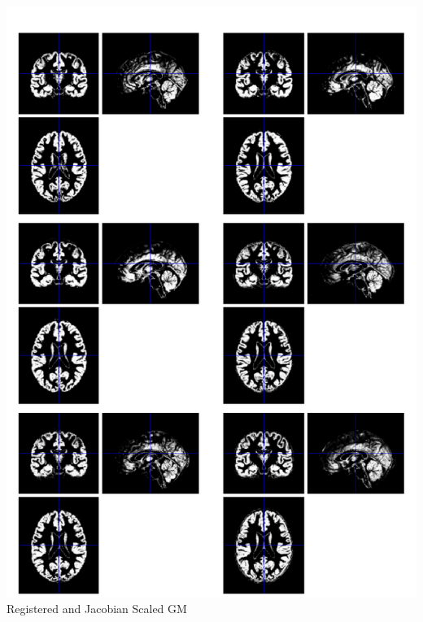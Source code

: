 \begin{frame}
\begin{columns}[c]
\includegraphics[width=1\textwidth]{wc1_ixi}
Registered and Jacobian Scaled GM


\end{columns}
\end{frame}
